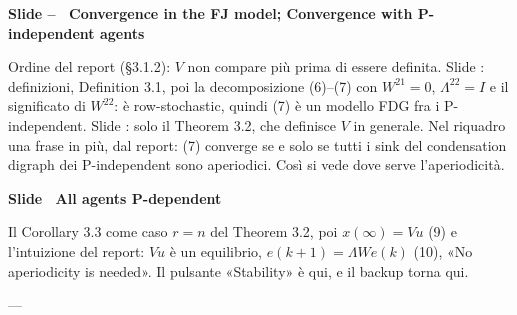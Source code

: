 \par\addvspace{14pt}\noindent\begin{minipage}{\textwidth}
{\color{unipd}\bfseries Slide -- \textperiodcentered\ Convergence in the FJ model; Convergence with P-independent agents}\par\smallskip
{\small Ordine del report (§3.1.2): $V$ non compare più prima di essere definita. Slide : definizioni, Definition 3.1, poi la decomposizione (6)--(7) con $W^{21} = 0$, $\Lambda^{22} = I$ e il significato di $W^{22}$: è row-stochastic, quindi (7) è un modello FDG fra i P-independent. Slide : solo il Theorem 3.2, che definisce $V$ in generale. Nel riquadro una frase in più, dal report: (7) converge se e solo se tutti i sink del condensation digraph dei P-independent sono aperiodici. Così si vede dove serve l'aperiodicità.}\par\smallskip
\noindent\begin{minipage}[t]{0.36\textwidth}\par
{}\par\smallskip
{}\par\smallskip
\end{minipage}\hfill\begin{minipage}[t]{0.61\textwidth}\par
{}\par\smallskip
{}\par\smallskip
\end{minipage}\par
\end{minipage}\par
\par\addvspace{14pt}\noindent\begin{minipage}{\textwidth}
{\color{unipd}\bfseries Slide  \textperiodcentered\ All agents P-dependent}\nuova\par\smallskip
{\small Il Corollary 3.3 come caso $r = n$ del Theorem 3.2, poi $x(\infty) = Vu$ (9) e l'intuizione del report: $Vu$ è un equilibrio, $e(k+1) = \Lambda W e(k)$ (10), «No aperiodicity is needed». Il pulsante «Stability» è qui, e il backup torna qui.}\par\smallskip
\noindent\begin{minipage}[t]{0.36\textwidth}\par
{\small ---}
\end{minipage}\hfill\begin{minipage}[t]{0.61\textwidth}\par
{}\par\smallskip
\end{minipage}\par
\end{minipage}\par
